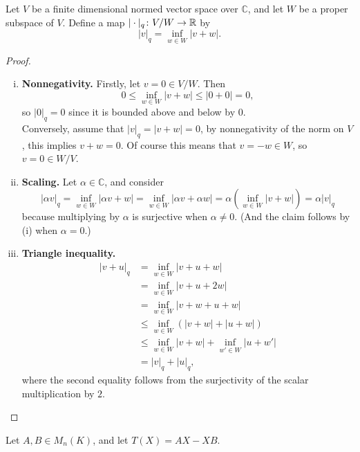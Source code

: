 \documentclass{article}
\begin{document}
\begin{problem}{4}
  Let $V$ be a finite dimensional normed vector space over $\mathbb C$,
  and let $W$ be a proper subspace of $V$. Define a map
  $|\cdot|_q \colon V/W \rightarrow \mathbb R$ by \[
    |v|_q = \inf_{w \in W} |v + w|.
  \]
\end{problem}

\begin{proof}
  \begin{enumerate}[(i)]
    \item \textbf{Nonnegativity.}
    Firstly, let $v = 0 \in V/W$. Then \[
      0 \leq \inf_{w \in W} |v + w| \leq |0 + 0| = 0,
    \] so $|0|_q = 0$ since it is bounded above and below by 0.
    \\
    Conversely, assume that $|v|_q = |v + w| = 0$, by nonnegativity of the norm
    on $V$, this implies $v + w = 0$.
    Of course this means that $v = -w \in W$, so $v = 0 \in W/V$.
    \item \textbf{Scaling.}
    Let $\alpha \in \mathbb C$, and consider \[
      |\alpha v|_q
      = \inf_{w \in W} |\alpha v + w|
      = \inf_{w \in W} |\alpha v + \alpha w|
      = \alpha\left(\inf_{w \in W} |v + w|\right)
      = \alpha |v|_q
    \] because multiplying by $\alpha$ is surjective when $\alpha \neq 0$.
    (And the claim follows by (i) when $\alpha = 0$.)
    \item \textbf{Triangle inequality.}
    \begin{align*}
      |v + u|_q
      &= \inf_{w \in W} |v + u + w| \\
      &= \inf_{w \in W} |v + u + 2w| \\
      &= \inf_{w \in W} |v + w + u + w| \\
      &\leq \inf_{w \in W} \left(|v + w| + |u + w|\right) \\
      &\leq \inf_{w \in W} |v + w| + \inf_{w' \in W} |u + w'| \\
      &= |v|_q + |u|_q,
    \end{align*} where the second equality follows from the surjectivity of the
    scalar multiplication by $2$.
  \end{enumerate}
\end{proof}
\begin{problem}{5}
  Let $A,B \in M_n(K)$, and let $T(X) = AX - XB$.
\end{problem}
\end{document}
